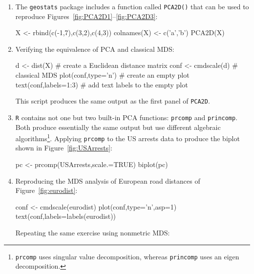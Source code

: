 \begin{enumerate}

\item The \texttt{geostats} package includes a function called
  \texttt{PCA2D()} that can be used to reproduce
  Figures~\ref{fig:PCA2D1}--\ref{fig:PCA2D3}:

\begin{script}
X <- rbind(c(-1,7),c(3,2),c(4,3))
colnames(X) <- c('a','b')
PCA2D(X)
\end{script}

\item Verifying the equivalence of PCA and classical MDS:

\begin{script}[firstnumber=3]
d <- dist(X)           # create a Euclidean distance matrix
conf <- cmdscale(d)    # classical MDS
plot(conf,type='n')    # create an empty plot
text(conf,labels=1:3)  # add text labels to the empty plot
\end{script}

This script produces the same output as the first panel of
\texttt{PCA2D}.

\item \texttt{R} contains not one but two built-in PCA functions:
  \texttt{prcomp} and \texttt{princomp}. Both produce essentially the
  same output but use different algebraic
  algorithms\footnote{\texttt{prcomp} uses singular value
  decomposition, whereas \texttt{princomp} uses an eigen
  decomposition.}. Applying \texttt{prcomp} to the US arrests data to
  produce the biplot shown in Figure~\ref{fig:USArrests}:

\begin{script}
pc <- prcomp(USArrests,scale.=TRUE)
biplot(pc)
\end{script}

\item Reproducing the MDS analysis of European road distances of
  Figure~\ref{fig:eurodist}:

\begin{script}
conf <- cmdscale(eurodist)
plot(conf,type='n',asp=1)
text(conf,labels=labels(eurodist))
\end{script}

Repeating the same exercise using nonmetric MDS:



\end{enumerate}
